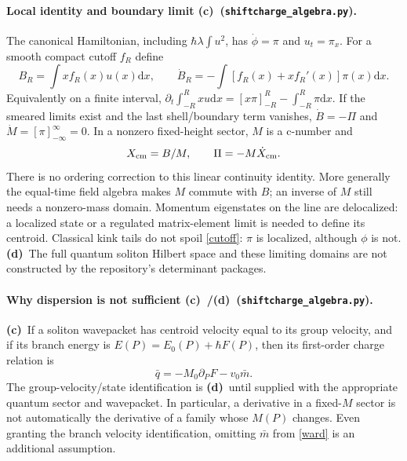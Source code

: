 \documentclass[11pt,a4paper]{article}
\newcommand{\C}{\textbf{(c)}\ }
\newcommand{\D}{\textbf{(d)}\ }
\newcommand{\dd}{\mathrm d}
\newcommand{\file}[1]{\nolinkurl{#1}}
\newcommand{\alg}{\file{shiftcharge_algebra.py}}
\begin{document}
\paragraph{Local identity and boundary limit \C (\alg).}
The canonical Hamiltonian, including $\hbar\lambda\int u^2$, has
$\dot\phi=\pi$ and $u_t=\pi_x$. For a smooth compact cutoff $f_R$ define
\begin{equation}
 B_R=\int x f_R(x)u(x)\dd x,\qquad
 \dot B_R=-\int[f_R(x)+xf_R'(x)]\pi(x)\dd x.\label{cutoff}
\end{equation}
Equivalently on a finite interval,
$\partial_t\int_{-R}^R xu\dd x=[x\pi]_{-R}^R-\int_{-R}^R\pi\dd x$.
If the smeared limits exist and the last shell/boundary term vanishes,
$\dot B=-\Pi$ and $\dot M=[\pi]_{-\infty}^{\infty}=0$.
In a nonzero fixed-height sector, $M$ is a c-number and
\begin{equation}
 X_{\rm cm}=B/M,\qquad \Pi=-M\dot X_{\rm cm}.\label{centroid}
\end{equation}
There is no ordering correction to this linear continuity identity.
More generally the equal-time field algebra makes $M$ commute with $B$;
an inverse of $M$ still needs a nonzero-mass domain. Momentum eigenstates on
the line are delocalized: a localized state or a regulated matrix-element
limit is needed to define its centroid. Classical kink tails do not spoil
\eqref{cutoff}: $\pi$ is localized, although $\phi$ is not.
\D The full quantum soliton Hilbert space and these limiting domains are
not constructed by the repository's determinant packages.

\paragraph{Why dispersion is not sufficient \C/\D (\alg).}
\C If a soliton wavepacket has centroid velocity equal to its group velocity,
and if its branch energy is $E(P)=E_0(P)+\hbar F(P)$, then its first-order
charge relation is
\begin{equation}
 \bar q=-M_0\partial_PF-v_0\bar m.\label{ward}
\end{equation}
The group-velocity/state identification is \D until supplied with the
appropriate quantum sector and wavepacket. In particular, a derivative in a
fixed-$M$ sector is not automatically the derivative of a family whose
$M(P)$ changes. Even granting the branch velocity identification, omitting
$\bar m$ from \eqref{ward} is an additional assumption.
\end{document}
